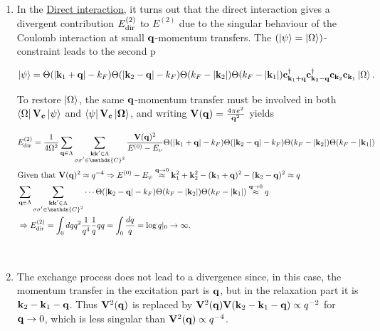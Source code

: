 \begin{enumerate}
    \item In the \underline{Direct interaction}, it turns out that the direct interaction gives a divergent contribution $E^{(2)}_{\textnormal{dir}}$ to $E^{(2)}$ due to the singular behaviour of the Coulomb interaction at small ${\bf q}$-momentum transfers. The $(\ket{\psi} = \ket{\Omega})$-constraint leads to the second p
    
    $$
        \ket{\psi} = \Theta(|{\bf k}_1 + {\bf q}| - k_F) \Theta(|{\bf k}_2 - {\bf q}| - k_F) \Theta(k_F - |{\bf k}_2|) \Theta(k_F - |{\bf k}_1|) {\bf c}_{{\bf k}_1 + {\bf q}}^\dagger {\bf c}_{{\bf k}_2 - {\bf q}}^\dagger {\bf c}_{{\bf k}_2} {\bf c}_{{\bf k}_1} \ket{\Omega}.
    $$
    
    To restore $\ket{\Omega}$,  the same ${\bf q}$-momentum transfer must be involved in both $\bra{\Omega} {\bf V}_c \ket{\psi}$ and $\bra{\psi} {\bf V}_c \ket{\Omega}$, and writing ${\bf V}({\bf q}) = \frac{4 \pi e^2}{{\bf q}^2}$ yields
    
    \begin{equation}
    \begin{split}
    & E^{(2)}_{\textnormal{dir}} = \frac{1}{4 \Omega^2} \sum_{{\bf q} \in \Lambda} \sum_{\substack{{\bf k}{\bf k}' \in \Lambda\\
    \sigma \sigma' \in \mathds{C}^2}} \frac{{\bf V}({\bf q})^2}{E^{(0)} - E_{\nu}} \Theta(|{\bf k}_1 + {\bf q}| - k_F) \Theta(|{\bf k}_2 - {\bf q}| - k_F) \Theta(k_F - |{\bf k}_2|) \Theta(k_F - |{\bf k}_1|) \\
    & \textnormal{Given that ${\bf V}({\bf q})^2 \approx q^{-4}$} \Rightarrow E^{(0)} - E_{\psi} \overset{{\bf q} \rightarrow 0}{\approx} {\bf k}_1^2 + {\bf k}_2^2 - ({\bf k}_1+{\bf q})^2 - ({\bf k}_2 - {\bf q})^2 \approx q \\
    & \sum_{{\bf q} \in \Lambda} \sum_{\substack{{\bf k}{\bf k}' \in \Lambda\\
    \sigma \sigma' \in \mathds{C}^2}} \cdots \Theta(|{\bf k}_2 - {\bf q}| - k_F) \Theta(k_F - |{\bf k}_2|) \Theta(k_F - |{\bf k}_1|)  \overset{{\bf q} \rightarrow 0}{\approx} q \\
    & \Rightarrow E^{(2)}_{\textnormal{dir}} = \int_{0} dq q^2 \frac{1}{q^4} \frac{1}{q} q q = \int_{0} \frac{dq}{q} = \log q|_{0} \rightarrow \infty.
    \end{split}
    \end{equation}
    
    \blanky \\
    
    \item The exchange process does not lead to a divergence since, in this case, the momentum transfer in the excitation part is ${\bf q}$, but in the relaxation part it is ${\bf k}_2-{\bf k}_1-{\bf q}$. Thus ${\bf V}^2({\bf q})$ is replaced by ${\bf V}^2({\bf q}){\bf V}({\bf k}_2-{\bf k}_1-{\bf q}) \propto q^{-2}$ for ${\bf q} \rightarrow 0$, which is less singular than ${\bf V}^2({\bf q}) \propto q^{-4}$. \\  
\end{enumerate}

